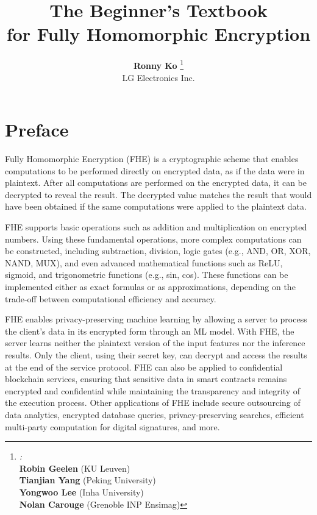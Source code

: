 \documentclass[11pt]{article}
\begin{document}
\title{\Huge{\textbf{The Beginner's Textbook}}\\ \Huge{\textbf{for Fully Homomorphic Encryption}}}
\author{
        \textbf{Ronny Ko} \thanks{\large \textit{:}\\  
        \textbf{Robin Geelen} (KU Leuven)\\  
        \textbf{Tianjian Yang} (Peking University)\\ \textbf{Yongwoo Lee} (Inha University) \\ \textbf{Nolan Carouge} (Grenoble INP Ensimag)
        }
        \\{LG Electronics Inc.}}%
\date{}



\begin{titlingpage}
\maketitle
\end{titlingpage}


\clearpage

\section*{Preface}
Fully Homomorphic Encryption (FHE) is a cryptographic scheme that enables computations to be performed directly on encrypted data, as if the data were in plaintext. After all computations are performed on the encrypted data, it can be decrypted to reveal the result. The decrypted value matches the result that would have been obtained if the same computations were applied to the plaintext data.

FHE supports basic operations such as addition and multiplication on encrypted numbers. Using these fundamental operations, more complex computations can be constructed, including subtraction, division, logic gates (e.g., AND, OR, XOR, NAND, MUX), and even advanced mathematical functions such as ReLU, sigmoid, and trigonometric functions (e.g., sin, cos). These functions can be implemented either as exact formulas or as approximations, depending on the trade-off between computational efficiency and accuracy. 

FHE enables privacy-preserving machine learning by allowing a server to process the client’s data in its encrypted form through an ML model. With FHE, the server learns neither the plaintext version of the input features nor the inference results. Only the client, using their secret key, can decrypt and access the results at the end of the service protocol.
FHE can also be applied to confidential blockchain services, ensuring that sensitive data in smart contracts remains encrypted and confidential while maintaining the transparency and integrity of the execution process.
Other applications of FHE include secure outsourcing of data analytics, encrypted database queries, privacy-preserving searches, efficient multi-party computation for digital signatures, and more.
\end{document}
